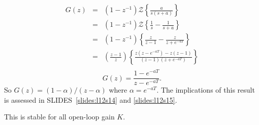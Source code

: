 \begin{eqnarray*}
	G(z) & = & (1-z^{-1})\mathcal{Z}\left\{\frac{a}{s(s+a)}\right\} \\
	     & = & (1-z^{-1})\mathcal{Z}\left\{\frac{1}{s}-\frac{1}{s+a}\right\} \\
	     & = & (1-z^{-1})\left\{\frac{z}{z-1}-\frac{z}{z+e^{-aT}}\right\} \\
		 & = & \left(\frac{z-1}{z}\right)\left\{\frac{z(z-e^{-aT})-z(z-1)}{(z-1)(z+e^{-aT})}\right\} \\
\end{eqnarray*}
$$G(z) = \frac{1-e^{-aT}}{z-e^{-aT}}.$$
So $G(z)=(1-\alpha)/(z-\alpha)$ where $\alpha=e^{-aT}$. The implications of this result is assessed in SLIDES~\ref{slides:l12s14} and \ref{slides:l12s15}.
\begin{slide}\label{slides:l12s14}
	\begin{center}
	\end{center}
	This is stable for all open-loop gain $K$.
\end{slide}
